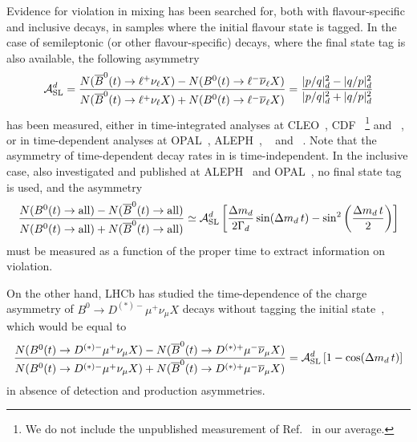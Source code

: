 Evidence for \CP violation in \Bd mixing
has been searched for,
both with flavour-specific and inclusive \Bd decays, 
in samples where the initial 
flavour state is tagged. In the case of semileptonic 
(or other flavour-specific) decays, 
where the final state tag is 
also available, the following asymmetry
\begin{equation} 
\ASLd = \frac{
N(\hbox{\Bdbar}(t) \to \ell^+      \nu_{\ell} X) -
N(\hbox{\Bd}(t)    \to \ell^- \bar{\nu}_{\ell} X) }{
N(\hbox{\Bdbar}(t) \to \ell^+      \nu_{\ell} X) +
N(\hbox{\Bd}(t)    \to \ell^- \bar{\nu}_{\ell} X) } 
= \frac{|p/q|_{\particle{d}}^2 - |q/p|_{\particle{d}}^2}%
{|p/q|_{\particle{d}}^2 + |q/p|_{\particle{d}}^2}
\labe{ASL}
\end{equation} 
has been measured, either in time-integrated analyses at 
CLEO~\cite{Behrens:2000qu,Jaffe:2001hz,*Jaffe:2001hz_cont},
CDF~\cite{Abe:1996zt}%
\footnote{
  \label{foot:life_mix:CDFnote9015:2007}
  We do not include the unpublished measurement of Ref.~\cite{CDFnote9015:2007} in our average.}
and \dzero~\cite{Abazov:2013uma,*Abazov:2011yk_mod,*Abazov:2010hv_mod_cont,*Abazov:2010hj_mod_cont,*Abazov:2011yk_cont,Abazov:2012uia},
or in time-dependent analyses at 
OPAL~\cite{Ackerstaff:1997vd}, ALEPH~\cite{Barate:2000uk}, 
\babar~\cite{Aubert:2003hd,*Aubert:2004xga_mod_cont,Aubert:2006nf,*Aubert:2002mn_mod_cont,Lees:2013sua,*Margoni:2013qx,*Aubert:2006sa_mod}
and \belle~\cite{Nakano:2005jb}.
Note that the asymmetry of time-dependent decay rates in  is time-independent.
In the inclusive case, also investigated and published
at ALEPH~\cite{Barate:2000uk} and OPAL~\cite{Abbiendi:1998av},
no final state tag is used, and the asymmetry~\cite{Beneke:1996hv,*Dunietz:1998av}
\begin{equation} 
\frac{
N(\hbox{\Bd}(t) \to {\rm all}) -
N(\hbox{\Bdbar}(t) \to {\rm all}) }{
N(\hbox{\Bd}(t) \to {\rm all}) +
N(\hbox{\Bdbar}(t) \to {\rm all}) } 
\simeq
\ASLd \left[ \frac{\dmd}{2\Gd} \sin(\dmd \,t) - 
\sin^2\left(\frac{\dmd \,t}{2}\right)\right] 
\labe{ASLincl}
\end{equation} 
must be measured as a function of the proper time to extract information 
on \CP violation.

On the other hand, LHCb has studied the time-dependence of the 
charge asymmetry of $B^0 \to D^{(*)-}\mu^+\nu_{\mu}X$ decays
without tagging the initial state~\cite{Aaij:2014nxa}, 
which would be equal to 
\begin{equation} 
\frac{N(\hbox{\Bd}(t) \to D^{(*)-}\mu^+\nu_{\mu}X)-N(\hbox{\Bdbar}(t) \to D^{(*)+}\mu^-\bar{\nu}_{\mu}X)}%
{N(\hbox{\Bd}(t) \to D^{(*)-}\mu^+\nu_{\mu}X)+N(\hbox{\Bdbar}(t) \to D^{(*)+}\mu^-\bar{\nu}_{\mu}X)} =
\ASLd \left[ 1- \cos(\dmd \,t)\right]
\label{eq:untagged_ASL}
\end{equation}
in absence of detection and production asymmetries.

